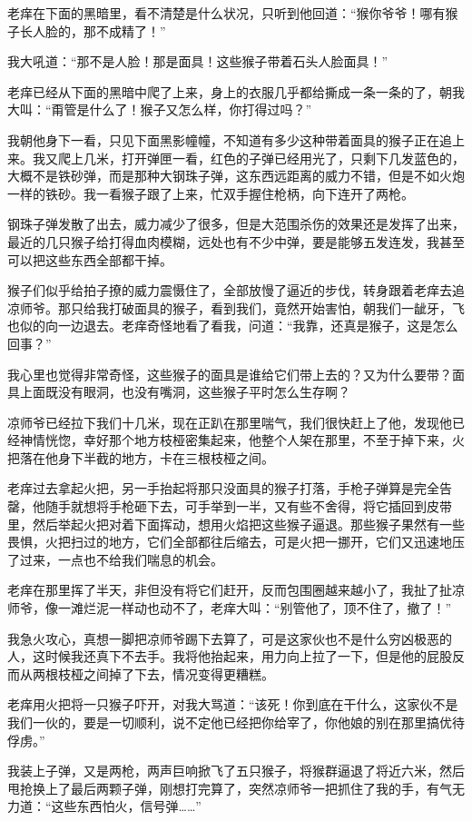 老痒在下面的黑暗里，看不清楚是什么状况，只听到他回道：“猴你爷爷！哪有猴子长人脸的，那不成精了！”

我大吼道：“那不是人脸！那是面具！这些猴子带着石头人脸面具！”

老痒已经从下面的黑暗中爬了上来，身上的衣服几乎都给撕成一条一条的了，朝我大叫：“甭管是什么了！猴子又怎么样，你打得过吗？”

我朝他身下一看，只见下面黑影幢幢，不知道有多少这种带着面具的猴子正在追上来。我又爬上几米，打开弹匣一看，红色的子弹已经用光了，只剩下几发蓝色的，大概不是铁砂弹，而是那种大钢珠子弹，这东西远距离的威力不错，但是不如火炮一样的铁砂。我一看猴子跟了上来，忙双手握住枪柄，向下连开了两枪。

钢珠子弹发散了出去，威力减少了很多，但是大范围杀伤的效果还是发挥了出来，最近的几只猴子给打得血肉模糊，远处也有不少中弹，要是能够五发连发，我甚至可以把这些东西全部都干掉。

猴子们似乎给拍子撩的威力震慑住了，全部放慢了逼近的步伐，转身跟着老痒去追凉师爷。那只给我打破面具的猴子，看到我们，竟然开始害怕，朝我们一龇牙，飞也似的向一边退去。老痒奇怪地看了看我，问道：“我靠，还真是猴子，这是怎么回事？”

我心里也觉得非常奇怪，这些猴子的面具是谁给它们带上去的？又为什么要带？面具上面既没有眼洞，也没有嘴洞，这些猴子平时怎么生存啊？

凉师爷已经拉下我们十几米，现在正趴在那里喘气，我们很快赶上了他，发现他已经神情恍惚，幸好那个地方枝桠密集起来，他整个人架在那里，不至于掉下来，火把落在他身下半截的地方，卡在三根枝桠之间。

老痒过去拿起火把，另一手抬起将那只没面具的猴子打落，手枪子弹算是完全告罄，他随手就想将手枪砸下去，可手举到一半，又有些不舍得，将它插回到皮带里，然后举起火把对着下面挥动，想用火焰把这些猴子逼退。那些猴子果然有一些畏惧，火把扫过的地方，它们全部都往后缩去，可是火把一挪开，它们又迅速地压了过来，一点也不给我们喘息的机会。

老痒在那里挥了半天，非但没有将它们赶开，反而包围圈越来越小了，我扯了扯凉师爷，像一滩烂泥一样动也动不了，老痒大叫：“别管他了，顶不住了，撤了！”

我急火攻心，真想一脚把凉师爷踢下去算了，可是这家伙也不是什么穷凶极恶的人，这时候我还真下不去手。我将他抬起来，用力向上拉了一下，但是他的屁股反而从两根枝桠之间掉了下去，情况变得更糟糕。

老痒用火把将一只猴子吓开，对我大骂道：“该死！你到底在干什么，这家伙不是我们一伙的，要是一切顺利，说不定他已经把你给宰了，你他娘的别在那里搞优待俘虏。”

我装上子弹，又是两枪，两声巨响掀飞了五只猴子，将猴群逼退了将近六米，然后甩抢换上了最后两颗子弹，刚想打完算了，突然凉师爷一把抓住了我的手，有气无力道：“这些东西怕火，信号弹……”

